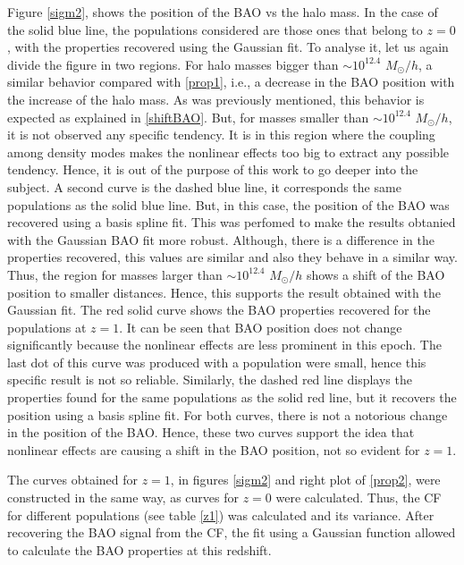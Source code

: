 Figure \ref{sigm2}, shows the position of the BAO vs the halo mass.
In the case of the solid blue line, the populations considered are those ones that
belong to $z=0$, with the properties recovered using the Gaussian fit. To analyse it, 
let us again divide the figure in two regions. For halo masses bigger than $\sim 10^{12.4}$ $M_{\odot}/h$,
a similar behavior compared with \ref{prop1}, i.e., a decrease in the BAO position with
the increase of the halo mass. As was previously mentioned, this behavior is expected 
as explained in \ref{shiftBAO}. But, for masses smaller than $\sim 10^{12.4}$ $M_{\odot}/h$, it is not 
observed any specific tendency. It is in this region where the coupling among density
modes makes the nonlinear effects too big to extract any possible tendency. Hence, it 
is out of the purpose of this work to go deeper into the subject. 
A second curve is the dashed blue line, it corresponds the same populations 
as the solid blue line. But, in this case, the position of the BAO was recovered
using a basis spline fit. This was perfomed to make the results obtanied
with the Gaussian BAO fit more robust. Although, there is a difference in the properties
recovered, this values are similar and also they behave in a similar way. Thus,
the region for masses larger than $\sim 10^{12.4}$ $M_{\odot}/h$ shows a shift of the BAO position
to smaller distances.
Hence, this supports the result obtained with the Gaussian fit. 
The red solid curve shows the BAO properties recovered for the populations at $z=1$.
It can be seen that BAO position does not change significantly because the nonlinear 
effects are less prominent in this epoch. The last dot of this curve was produced with 
a population were small, hence this specific result is not so reliable. 
Similarly, the dashed red line displays
the properties found for the same populations as the solid red line, but it recovers
the position using a basis spline fit. For both curves, there is not a notorious change 
in the position of the BAO. Hence, these two curves support the idea that nonlinear 
effects are causing a shift in the BAO position, not so evident for $z=1$. 

The curves obtained for $z=1$, in figures \ref{sigm2} and right plot of \ref{prop2},
were constructed in the same way, as curves for $z=0$ were calculated. Thus, the CF
for different populations (see table \ref{z1}) was calculated and its variance. After
recovering the BAO signal from the CF, the fit using a Gaussian function allowed to
calculate the BAO properties at this redshift. 


